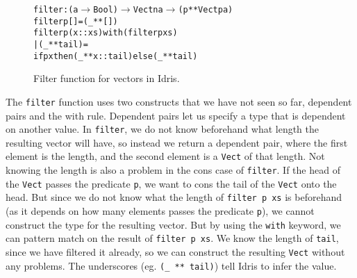 \begin{figure}
\begin{alltt}
filter : (a \(\to\) Bool) \(\to\) Vect n a \(\to\) (p ** Vect p a)
filter p [] = (_ ** [])
filter p (x::xs) with (filter p xs)
  | (_ ** tail) =
    if p x then (_ ** x::tail) else (_ ** tail)
\end{alltt}
\caption{Filter function for vectors in Idris.}
\label{fig:filter}
\end{figure}

The \texttt{filter} function uses two constructs that we have not seen so far, dependent pairs and the with rule. Dependent pairs let us specify a type that is dependent on another value. In \texttt{filter}, we do not know beforehand what length the resulting vector will have, so instead we return a dependent pair, where the first element is the length, and the second element is a \texttt{Vect} of that length. Not knowing the length is also a problem in the cons case of \texttt{filter}. If the head of the \texttt{Vect} passes the predicate \texttt{p}, we want to cons the tail of the \texttt{Vect} onto the head. But since we do not know what the length of \texttt{filter p xs} is beforehand (as it depends on how many elements passes the predicate \texttt{p}), we cannot construct the type for the resulting vector. But by using the \texttt{with} keyword, we can pattern match on the result of \texttt{filter p xs}. We know the length of \texttt{tail}, since we have filtered it already, so we can construct the resulting \texttt{Vect} without any problems. The underscores (eg. \texttt{(\_ ** tail)}) tell Idris to infer the value.


